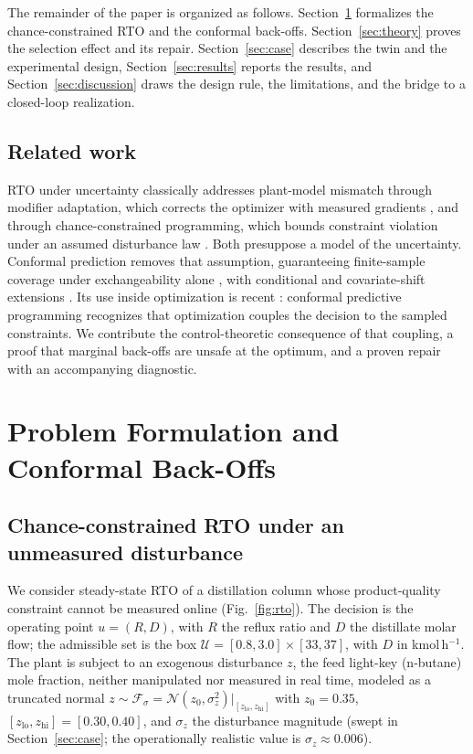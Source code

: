 \documentclass[journal]{IEEEtran}
\begin{document}
The remainder of the paper is organized as follows. Section~\ref{sec:methods} formalizes the
chance-constrained RTO and the conformal back-offs. Section~\ref{sec:theory} proves the selection
effect and its repair. Section~\ref{sec:case} describes the twin and the experimental design,
Section~\ref{sec:results} reports the results, and Section~\ref{sec:discussion} draws the design
rule, the limitations, and the bridge to a closed-loop realization.

\subsection{Related work}
\label{sec:related}
RTO under uncertainty classically addresses plant-model mismatch through modifier adaptation,
which corrects the optimizer with measured gradients \cite{marchetti2009,chachuat2009}, and
through chance-constrained programming, which bounds constraint violation under an assumed
disturbance law \cite{li2008,bradford2019,bradford2020}. Both presuppose a model of the
uncertainty. Conformal prediction removes that assumption, guaranteeing finite-sample coverage
under exchangeability alone \cite{vovk2005,lei2018,angelopoulos2023}, with conditional and
covariate-shift extensions \cite{romano2019,gibbs2021,gibbscherian2023,tibshirani2019,barber2023}.
Its use inside optimization is recent \cite{zhao2024cpp,zhang2024}: conformal predictive
programming recognizes that optimization couples the decision to the sampled constraints. We
contribute the control-theoretic consequence of that coupling, a proof that marginal back-offs
are unsafe at the optimum, and a proven repair with an accompanying diagnostic.

\section{Problem Formulation and Conformal Back-Offs}
\label{sec:methods}

\subsection{Chance-constrained RTO under an unmeasured disturbance}
\label{sec:methods-rto}
We consider steady-state RTO of a distillation column whose product-quality constraint cannot be
measured online (Fig.~\ref{fig:rto}). The decision is the operating point $u=(R,D)$, with $R$ the
reflux ratio and $D$ the distillate molar flow; the admissible set is the box
$\mathcal U=[0.8,3.0]\times[33,37]$, with $D$ in kmol\,h$^{-1}$. The plant is subject to an
exogenous disturbance $z$, the feed light-key (n-butane) mole fraction, neither manipulated nor
measured in real time, modeled as a truncated normal
$z\sim\mathcal F_\sigma=\mathcal N(z_0,\sigma_z^2)|_{[z_{\mathrm{lo}},z_{\mathrm{hi}}]}$ with
$z_0=0.35$, $[z_{\mathrm{lo}},z_{\mathrm{hi}}]=[0.30,0.40]$, and $\sigma_z$ the disturbance
magnitude (swept in Section~\ref{sec:case}; the operationally realistic value is
$\sigma_z\approx0.006$).
\end{document}
